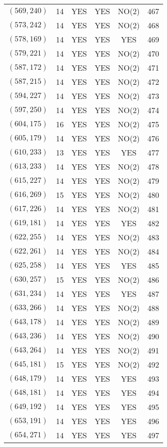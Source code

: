 \begin{longtable}{|c|c|c|c|c|c|}
$(569, 240)$ & 14 & YES & YES & NO(2) & 467\\
$(573, 242)$ & 14 & YES & YES & NO(2) & 468\\
$(578, 169)$ & 14 & YES & YES & YES & 469\\
$(579, 221)$ & 14 & YES & YES & NO(2) & 470\\
$(587, 172)$ & 14 & YES & YES & NO(2) & 471\\
$(587, 215)$ & 14 & YES & YES & NO(2) & 472\\
$(594, 227)$ & 14 & YES & YES & NO(2) & 473\\
$(597, 250)$ & 14 & YES & YES & NO(2) & 474\\
$(604, 175)$ & 16 & YES & YES & NO(2) & 475\\
$(605, 179)$ & 14 & YES & YES & NO(2) & 476\\
$(610, 233)$ & 13 & YES & YES & YES & 477\\
$(613, 233)$ & 14 & YES & YES & NO(2) & 478\\
$(615, 227)$ & 14 & YES & YES & NO(2) & 479\\
$(616, 269)$ & 15 & YES & YES & NO(2) & 480\\
$(617, 226)$ & 14 & YES & YES & NO(2) & 481\\
$(619, 181)$ & 14 & YES & YES & YES & 482\\
$(622, 255)$ & 14 & YES & YES & NO(2) & 483\\
$(622, 261)$ & 14 & YES & YES & NO(2) & 484\\
$(625, 258)$ & 14 & YES & YES & YES & 485\\
$(630, 257)$ & 15 & YES & YES & NO(2) & 486\\
$(631, 234)$ & 14 & YES & YES & YES & 487\\
$(633, 266)$ & 14 & YES & YES & NO(2) & 488\\
$(643, 178)$ & 14 & YES & YES & NO(2) & 489\\
$(643, 236)$ & 14 & YES & YES & NO(2) & 490\\
$(643, 264)$ & 14 & YES & YES & NO(2) & 491\\
$(645, 181)$ & 15 & YES & YES & NO(2) & 492\\
$(648, 179)$ & 14 & YES & YES & YES & 493\\
$(648, 181)$ & 14 & YES & YES & YES & 494\\
$(649, 192)$ & 14 & YES & YES & YES & 495\\
$(653, 191)$ & 14 & YES & YES & YES & 496\\
$(654, 271)$ & 14 & YES & YES & YES & 497\\

\end{longtable}
